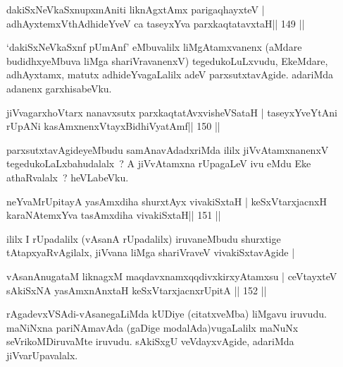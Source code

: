 
\begin{shl}
dakiSxNeV\s kaSxnupxmAniti liknAgxtAmx parigaqhayxteV |
adhAyxtemxV\s thAdhideYveV ca taseyxYva parxkaqtatavxtaH\hfill || 149 ||
\end{shl}

\begin{artha}
`dakiSxNeV\s kaSxnf pUmAnf' eMbuvalilx liMgAtamxvanenx (aMdare   budidhxyeMbuva liMga shariVravanenxV) tegedukoLuLxvudu, EkeMdare,   adhAyxtamx, matutx adhideYvagaLalilx adeV parxsutxtavAgide. adariMda   adanenx garxhisabeVku.
\end{artha}

\begin{shl}
jiVvagarxhoV\s tarx nanavxsutx parxkaqtatAvxvisheVSataH |
taseyxYveYtAni rUpANi kasAmxnenxVtayxBidhiVyatAmf\hfill || 150 ||
\end{shl}

\begin{artha}
parxsutxtavAgideyeMbudu samAnavAdadxriMda ililx jiVvAtamxnanenxV tegedukoLaLxbahudalalx~? A jiVvAtamxna rUpagaLeV ivu eMdu Eke  athaRvalalx~? heVLabeVku.
\end{artha}

\begin{shl}
neYvaMrUpitayA yasAmxdiha shurxtAyx vivakiSxtaH |
keSxVtarxjacnxH karaNAtemxYva tasAmxdiha vivakiSxtaH\hfill || 151 ||
\end{shl}

\begin{artha}
ililx I rUpadalilx (vAsanA rUpadalilx) iruvaneMbudu shurxtige
tAtapxyaRvAgilalx, jiVvana liMga shariVraveV vivakiSxtavAgide |
\end{artha}


\begin{shl}
vAsanAnugataM liknagxM maqdavxnamxqqdivxkirxyAtamxsu |
ceVtayxteV sAkiSxNA yasAmxnAnxtaH keSxVtarxjacnxrUpitA \hfill || 152 ||
\end{shl}

\begin{artha}
rAgadevxVSAdi-vAsanegaLiMda kUDiye (citatxveMba) liMgavu iruvudu. maNiNxna pariNAmavAda (gaDige modalAda)vugaLalilx maNuNx seVrikoMDiruvaMte iruvudu. sAkiSxgU veVdayxvAgide, adariMda jiVvarUpavalalx.
\end{artha}


